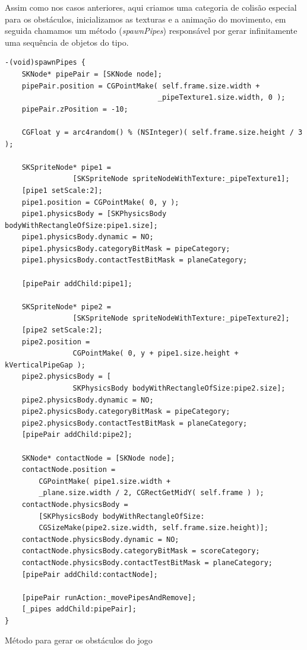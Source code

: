 \documentclass[a4paper,12pt,brazil,oneside]{book}
\begin{document}
Assim como nos casos anteriores, aqui criamos uma categoria de colisão especial para os obstáculos, inicializamos as texturas e a animação do movimento, em seguida chamamos um método (\emph{spawnPipes}) responsável por gerar infinitamente uma sequência de objetos do tipo.

\begin{listing}[H]
\begin{verbatim}
-(void)spawnPipes {
    SKNode* pipePair = [SKNode node];
    pipePair.position = CGPointMake( self.frame.size.width + 
    								_pipeTexture1.size.width, 0 );
    pipePair.zPosition = -10;
    
    CGFloat y = arc4random() % (NSInteger)( self.frame.size.height / 3 );
    
    SKSpriteNode* pipe1 = 
    			[SKSpriteNode spriteNodeWithTexture:_pipeTexture1];
    [pipe1 setScale:2];
    pipe1.position = CGPointMake( 0, y );
    pipe1.physicsBody = [SKPhysicsBody bodyWithRectangleOfSize:pipe1.size];
    pipe1.physicsBody.dynamic = NO;
    pipe1.physicsBody.categoryBitMask = pipeCategory;
    pipe1.physicsBody.contactTestBitMask = planeCategory;
    
    [pipePair addChild:pipe1];
    
    SKSpriteNode* pipe2 = 
    			[SKSpriteNode spriteNodeWithTexture:_pipeTexture2];
    [pipe2 setScale:2];
    pipe2.position = 
    			CGPointMake( 0, y + pipe1.size.height + kVerticalPipeGap );
    pipe2.physicsBody = [
    			SKPhysicsBody bodyWithRectangleOfSize:pipe2.size];
    pipe2.physicsBody.dynamic = NO;
    pipe2.physicsBody.categoryBitMask = pipeCategory;
    pipe2.physicsBody.contactTestBitMask = planeCategory;
    [pipePair addChild:pipe2];
    
    SKNode* contactNode = [SKNode node];
    contactNode.position = 
    	CGPointMake( pipe1.size.width + 
		_plane.size.width / 2, CGRectGetMidY( self.frame ) );
    contactNode.physicsBody = 
    	[SKPhysicsBody bodyWithRectangleOfSize:
		CGSizeMake(pipe2.size.width, self.frame.size.height)];
    contactNode.physicsBody.dynamic = NO;
    contactNode.physicsBody.categoryBitMask = scoreCategory;
    contactNode.physicsBody.contactTestBitMask = planeCategory;
    [pipePair addChild:contactNode];
    
    [pipePair runAction:_movePipesAndRemove];
    [_pipes addChild:pipePair];
}
\end{verbatim}
\caption{Método para gerar os obstáculos do jogo}
\end{listing}
\end{document}
